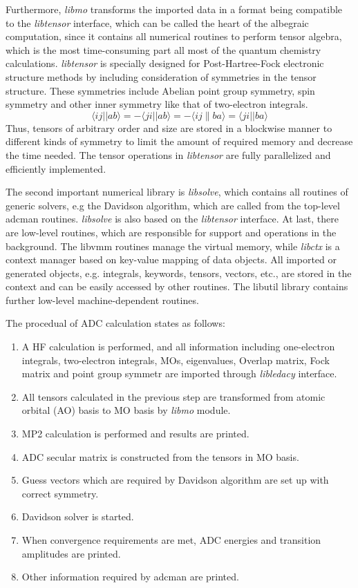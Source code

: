 \documentclass[bachelor, english]{ustcthesis}
\begin{document}
Furthermore, \emph{libmo} transforms the imported data in a format being compatible to the \emph{libtensor} \cite{libtensor} interface, which can be called the heart of the albegraic computation, since it contains all numerical routines to perform tensor algebra, which is the most time-consuming part all most of the quantum chemistry calculations.
\emph{libtensor} is specially designed for Post-Hartree-Fock electronic structure methods by including consideration of symmetries in the tensor structure.
These symmetries include Abelian point group symmetry, spin symmetry and other inner symmetry like that of two-electron integrals.
\begin{equation}
	\langle i j| | a b\rangle=-\langle j i| | a b\rangle=-\langle i j \| b a\rangle=\langle j i| | b a\rangle
\end{equation}
Thus, tensors of arbitrary order and size are stored in a blockwise manner to different kinds of symmetry to limit the amount of required memory and decrease the time needed.
The tensor operations in \emph{libtensor} are fully parallelized and efficiently implemented.

The second important numerical library is \emph{libsolve}, which contains all routines of
generic solvers, e.g the Davidson algorithm, which are called from the top-level adcman
routines. \emph{libsolve} is also based on the \emph{libtensor} interface. At last, there are low-level
routines, which are responsible for support and operations in the background. The libvmm
routines manage the virtual memory, while \emph{libctx} is a context manager based on key-value
mapping of data objects. All imported or generated objects, e.g. integrals, keywords,
tensors, vectors, etc., are stored in the context and can be easily accessed by other routines.
The libutil library contains further low-level machine-dependent routines.

The procedual of ADC calculation states as follows:
\begin{enumerate}
	\item A HF calculation is performed, and all information including one-electron integrals, two-electron integrals, MOs, eigenvalues, Overlap matrix, Fock matrix and point group symmetr are imported through \emph{libledacy} interface.
	\item All tensors calculated in the previous step are transformed from atomic orbital (AO) basis to MO basis by \emph{libmo} module.
	\item MP2 calculation is performed and results are printed.
	\item ADC secular matrix is constructed from the tensors in MO basis.
	\item Guess vectors which are required by Davidson algorithm are set up with correct symmetry.
	\item Davidson solver is started.
	\item When convergence requirements are met, ADC energies and transition amplitudes are printed.
	\item Other information required by adcman are printed.
\end{enumerate}
\end{document}
